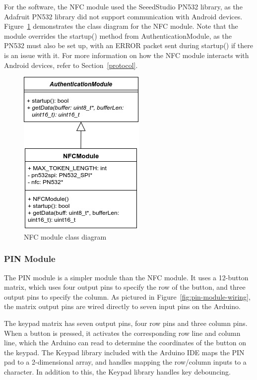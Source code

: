\documentclass[12pt]{report}
\let\Oldsubsubsection\subsubsection
\renewcommand{\subsubsection}{\FloatBarrier\Oldsubsubsection}
\begin{document}
For the software, the NFC module used the SeeedStudio PN532 library, as the Adafruit PN532 library did not support 
communication with Android devices. Figure~\ref{fig:nfc-module-class} demonstrates the class diagram for the NFC 
module. Note that the module overrides the startup() method from AuthenticationModule, as the PN532 must also be set 
up, with an ERROR packet sent during startup() if there is an issue with it. For more information on how the NFC module 
interacts with Android devices, refer to Section~\ref{protocol}.

\begin{figure}
    \centering
    \includegraphics{Diagrams/Hardware-Diagrams/nfc_module_class}
    \caption{NFC module class diagram}
    \label{fig:nfc-module-class}
\end{figure}

\subsubsection{PIN Module} \label{pin-modules}

The PIN module is a simpler module than the NFC module. It uses a 12-button matrix, which uses four output pins to 
specify the row of the button, and three output pins to specify the column. As pictured in 
Figure~\ref{fig:pin-module-wiring}, the matrix output pins are wired directly to seven input pins on the Arduino.

The keypad matrix has seven output pins, four row pins and three column pins. When a button is pressed, it activates 
the corresponding row line and column line, which the Arduino can read to determine the coordinates of the button on the 
keypad. The Keypad library included with the Arduino IDE maps the PIN pad to a 2-dimensional array, and handles mapping 
the row/column inputs to a character. In addition to this, the Keypad library handles key debouncing.
\end{document}

